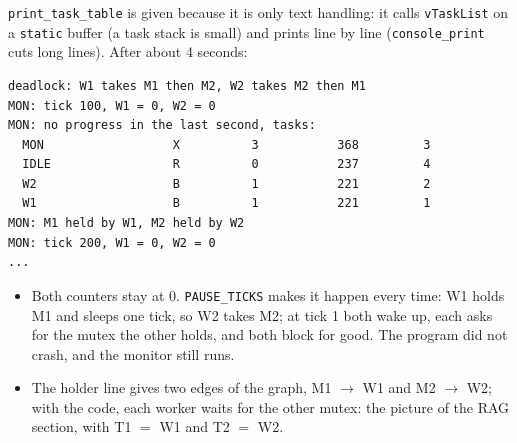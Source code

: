 \noindent \texttt{print\_task\_table} is given because it is only text handling: it calls \texttt{vTaskList} on a \texttt{static} buffer (a task stack is small) and prints line by line (\texttt{console\_print} cuts long lines). After about 4 seconds:
{\verbatimscriptsize
\begin{verbatim}
deadlock: W1 takes M1 then M2, W2 takes M2 then M1
MON: tick 100, W1 = 0, W2 = 0
MON: no progress in the last second, tasks:
  MON                  X          3           368         3
  IDLE                 R          0           237         4
  W2                   B          1           221         2
  W1                   B          1           221         1
MON: M1 held by W1, M2 held by W2
MON: tick 200, W1 = 0, W2 = 0
...
\end{verbatim}}
\begin{itemize}
    \item Both counters stay at 0. \texttt{PAUSE\_TICKS} makes it happen every time: W1 holds M1 and sleeps one tick, so W2 takes M2; at tick 1 both wake up, each asks for the mutex the other holds, and both block for good. The program did not crash, and the monitor still runs.
    \item The holder line gives two edges of the graph, M1 $\rightarrow$ W1 and M2 $\rightarrow$ W2; with the code, each worker waits for the other mutex: the picture of the RAG section, with T1 $=$ W1 and T2 $=$ W2.
\end{itemize}

